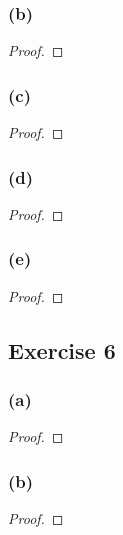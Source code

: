 \documentclass[14pt]{extarticle}
\begin{document}
\subsubsection{(b)}

\begin{proof}

\end{proof}

\subsubsection{(c)}

\begin{proof}

\end{proof}

\subsubsection{(d)}

\begin{proof}

\end{proof}

\subsubsection{(e)}

\begin{proof}

\end{proof}

\subsection{Exercise 6}

\subsubsection{(a)}

\begin{proof}

\end{proof}

\subsubsection{(b)}

\begin{proof}

\end{proof}
\end{document}
